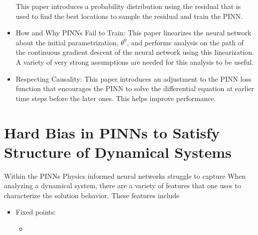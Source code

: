 \documentclass[11pt]{article}
\begin{document}
\begin{itemize}
This paper introduces a probability distribution using the residual that is used to find the best locations to sample the residual and train the PINN.
\item How and Why PINNs Fail to Train: This paper linearizes the neural network about the initial parametrization, $\theta^0$, and performs analysis on the path of the continuous gradient descent of the neural network using this linearization. A variety of very strong assumptions are needed for this analysis to be useful.
\item Respecting Causality: This paper introduces an adjustment to the PINN loss function that encourages the PINN to solve the differential equation at earlier time steps before the later ones. This helps improve performance.
\end{itemize}
\section*{Hard Bias in PINNs to Satisfy Structure of Dynamical Systems}
Within the PINNs 
Physics informed neural networks struggle to capture When analyzing a dynamical system, there are a variety of features that one uses to characterize the solution behavior. These features include
\begin{itemize}
	\item Fixed points: \begin{itemize}
	\item 
	\end{itemize}
\end{itemize}
\pagebreak
\end{document}
